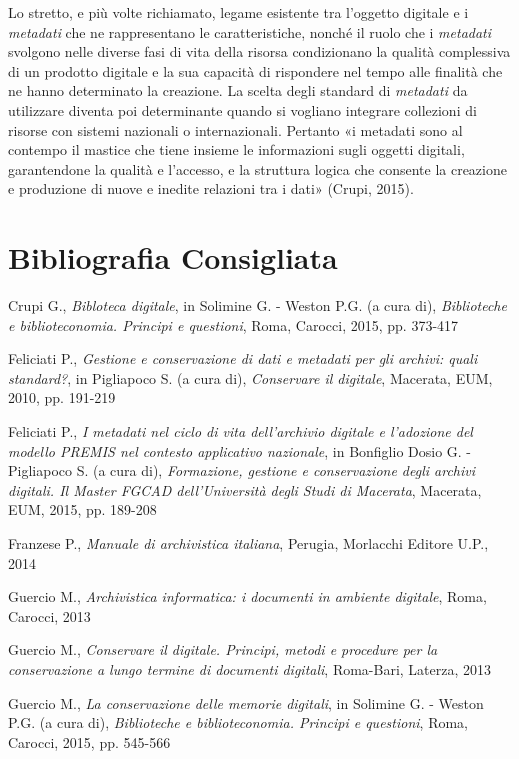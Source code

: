{Lo stretto, e più volte richiamato, legame esistente tra l'oggetto
digitale e i \emph{metadati} che ne rappresentano le caratteristiche,
nonché il ruolo che i \emph{metadati} svolgono nelle diverse fasi di
vita della risorsa condizionano la qualità complessiva di un prodotto
digitale e la sua capacità di rispondere nel tempo alle finalità che ne
hanno determinato la creazione. La scelta degli standard di
\emph{metadati} da utilizzare diventa poi determinante quando si
vogliano integrare collezioni di risorse con sistemi nazionali o
internazionali. Pertanto «i metadati sono al contempo il mastice che
tiene insieme le informazioni sugli oggetti digitali, garantendone la
qualità e l'accesso, e la struttura logica che consente la creazione e
produzione di nuove e inedite relazioni tra i dati» (Crupi, 2015).

\section*{Bibliografia Consigliata}
{\parindent0pt 
Crupi G., \emph{Bibloteca digitale}, in Solimine G. - Weston P.G. (a
cura di), \emph{Biblioteche e biblioteconomia. Principi e questioni},
Roma, Carocci, 2015, pp. 373-417

Feliciati P., \emph{Gestione e conservazione di dati e metadati per gli
archivi: quali standard?}, in Pigliapoco S. (a cura di),
\emph{Conservare il digitale}, Macerata, EUM, 2010, pp. 191-219

Feliciati P., \emph{I metadati nel ciclo di vita dell'archivio digitale
e l'adozione del modello PREMIS nel contesto applicativo nazionale}, in
Bonfiglio Dosio G. - Pigliapoco S. (a cura di), \emph{Formazione,
gestione e conservazione degli archivi digitali. Il Master FGCAD
dell'Università degli Studi di Macerata}, Macerata, EUM, 2015, pp.
189-208

Franzese P., \emph{Manuale di archivistica italiana}, Perugia, Morlacchi
Editore U.P., 2014

Guercio M., \emph{Archivistica informatica: i documenti in ambiente
digitale}, Roma, Carocci, 2013

Guercio M., \emph{Conservare il digitale. Principi, metodi e procedure
per la conservazione a lungo termine di documenti digitali}, Roma-Bari,
Laterza, 2013

Guercio M., \emph{La conservazione delle memorie digitali}, in Solimine
G. - Weston P.G. (a cura di), \emph{Biblioteche e biblioteconomia.
Principi e questioni}, Roma, Carocci, 2015, pp. 545-566

}}
